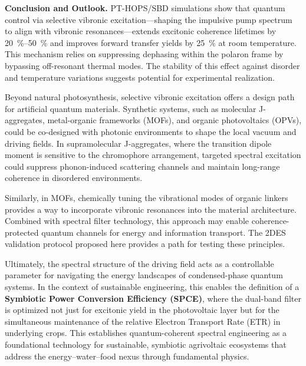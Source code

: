 \documentclass[journal=jpcl,manuscript=letter]{achemso}
\begin{document}
\textbf{Conclusion and Outlook.}
PT-HOPS/SBD simulations show that quantum control via selective vibronic excitation---shaping the impulsive pump spectrum to align with vibronic resonances---extends excitonic coherence lifetimes by \SIrange{20}{50}{\percent} and improves forward transfer yields by \SI{25}{\percent} at room temperature. This mechanism relies on suppressing dephasing within the polaron frame by bypassing off-resonant thermal modes. The stability of this effect against disorder and temperature variations suggests potential for experimental realization.

Beyond natural photosynthesis, selective vibronic excitation offers a design path for artificial quantum materials. Synthetic systems, such as molecular J-aggregates, metal-organic frameworks (MOFs), and organic photovoltaics (OPVs), could be co-designed with photonic environments to shape the local vacuum and driving fields. In supramolecular J-aggregates, where the transition dipole moment is sensitive to the chromophore arrangement, targeted spectral excitation could suppress phonon-induced scattering channels and maintain long-range coherence in disordered environments.

Similarly, in MOFs, chemically tuning the vibrational modes of organic linkers provides a way to incorporate vibronic resonances into the material architecture. Combined with spectral filter technology, this approach may enable coherence-protected quantum channels for energy and information transport. The 2DES validation protocol proposed here provides a path for testing these principles. 

Ultimately, the spectral structure of the driving field acts as a controllable parameter for navigating the energy landscapes of condensed-phase quantum systems. In the context of sustainable engineering, this enables the definition of a \textbf{Symbiotic Power Conversion Efficiency (SPCE)}, where the dual-band filter is optimized not just for excitonic yield in the photovoltaic layer but for the simultaneous maintenance of the relative Electron Transport Rate (ETR) in underlying crops. This establishes quantum-coherent spectral engineering as a foundational technology for sustainable, symbiotic agrivoltaic ecosystems that address the energy--water--food nexus through fundamental physics.

\end{document}
